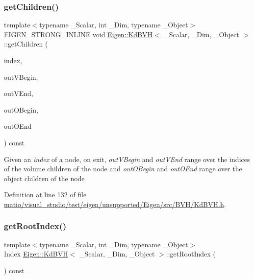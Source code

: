 \subsubsection{\texorpdfstring{get\+Children()}{getChildren()}\hspace{0.1cm}{\footnotesize\ttfamily [2/2]}}
{\footnotesize\ttfamily template$<$typename \+\_\+\+Scalar, int \+\_\+\+Dim, typename \+\_\+\+Object$>$ \\
E\+I\+G\+E\+N\+\_\+\+S\+T\+R\+O\+N\+G\+\_\+\+I\+N\+L\+I\+NE void \hyperlink{class_eigen_1_1_kd_b_v_h}{Eigen\+::\+Kd\+B\+VH}$<$ \+\_\+\+Scalar, \+\_\+\+Dim, \+\_\+\+Object $>$\+::get\+Children (\begin{DoxyParamCaption}\item[{Index}]{index,  }\item[{Volume\+Iterator \&}]{out\+V\+Begin,  }\item[{Volume\+Iterator \&}]{out\+V\+End,  }\item[{Object\+Iterator \&}]{out\+O\+Begin,  }\item[{Object\+Iterator \&}]{out\+O\+End }\end{DoxyParamCaption}) const\hspace{0.3cm}{\ttfamily [inline]}}

Given an {\itshape index} of a node, on exit, {\itshape out\+V\+Begin} and {\itshape out\+V\+End} range over the indices of the volume children of the node and {\itshape out\+O\+Begin} and {\itshape out\+O\+End} range over the object children of the node 

Definition at line \hyperlink{matio_2visual__studio_2test_2eigen_2unsupported_2_eigen_2src_2_b_v_h_2_kd_b_v_h_8h_source_l00132}{132} of file \hyperlink{matio_2visual__studio_2test_2eigen_2unsupported_2_eigen_2src_2_b_v_h_2_kd_b_v_h_8h_source}{matio/visual\+\_\+studio/test/eigen/unsupported/\+Eigen/src/\+B\+V\+H/\+Kd\+B\+V\+H.\+h}.

\mbox{\label{class_eigen_1_1_kd_b_v_h_a8111486ece7980dd8f0d10aff9693d11}} 
\subsubsection{\texorpdfstring{get\+Root\+Index()}{getRootIndex()}\hspace{0.1cm}{\footnotesize\ttfamily [1/2]}}
{\footnotesize\ttfamily template$<$typename \+\_\+\+Scalar, int \+\_\+\+Dim, typename \+\_\+\+Object$>$ \\
Index \hyperlink{class_eigen_1_1_kd_b_v_h}{Eigen\+::\+Kd\+B\+VH}$<$ \+\_\+\+Scalar, \+\_\+\+Dim, \+\_\+\+Object $>$\+::get\+Root\+Index (\begin{DoxyParamCaption}{ }\end{DoxyParamCaption}) const\hspace{0.3cm}{\ttfamily [inline]}}

